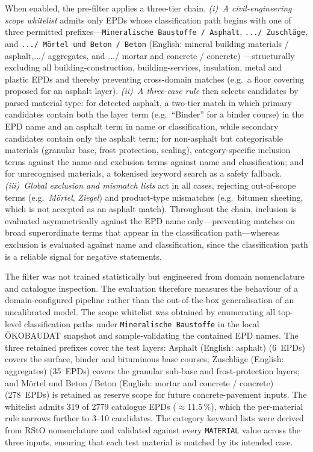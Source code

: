 \documentclass[10pt, a4paper, twocolumn]{article}
\begin{document}
When enabled, the pre-filter applies a three-tier chain. \emph{(i)~A civil-engineering
scope whitelist} admits only EPDs whose classification path begins with one of three
permitted prefixes---\texttt{Mineralische Baustoffe / Asphalt},
\texttt{.../ Zuschl\"age}, and \texttt{.../ M\"ortel und Beton / Beton} (English: mineral building materials / asphalt,.../ aggregates, and .../ mortar and concrete / concrete) ---structurally
excluding all building-construction, building-services, insulation, metal and plastic
EPDs and thereby preventing cross-domain matches (e.g.\ a floor covering proposed for
an asphalt layer). \emph{(ii)~A three-case rule} then selects candidates by parsed
material type: for detected asphalt, a two-tier match in which primary candidates
contain both the layer term (e.g.\ ``Binder'' for a binder course) in the EPD name
and an asphalt term in name or classification, while secondary candidates contain only
the asphalt term; for non-asphalt but categorisable materials (granular base, frost
protection, sealing), category-specific inclusion terms against the name and exclusion
terms against name and classification; and for unrecognised materials, a tokenised
keyword search as a safety fallback. \emph{(iii)~Global exclusion and mismatch
lists} act in all cases, rejecting out-of-scope terms (e.g.\ \emph{M\"ortel},
\emph{Ziegel}) and product-type mismatches (e.g.\ bitumen sheeting, which is not
accepted as an asphalt match). Throughout the chain, inclusion is evaluated
asymmetrically against the EPD name only---preventing matches on broad superordinate
terms that appear in the classification path---whereas exclusion is evaluated against
name and classification, since the classification path is a reliable signal for
negative statements.

The filter was not trained statistically but engineered from domain nomenclature and catalogue inspection. The evaluation therefore measures the behaviour of a domain-configured pipeline rather than the out-of-the-box generalisation of an uncalibrated model. The scope
whitelist was obtained by enumerating all top-level classification paths under
\texttt{Mineralische Baustoffe} in the local \"OKOBAUDAT snapshot and sample-validating
the contained EPD names. The three retained prefixes cover the test layers: Asphalt (English: asphalt)
(6~EPDs) covers the surface, binder and bituminous base courses; Zuschl\"age (English: aggregates)
(35~EPDs) covers the granular sub-base and frost-protection layers; and
M\"ortel und Beton\,/\,Beton (English: mortar and concrete / concrete) (278~EPDs) is retained as reserve scope for future
concrete-pavement inputs. The whitelist admits 319 of 2779 catalogue EPDs
($\approx$11.5\,\%), which the per-material rule narrows further to 3--10 candidates.
The category keyword lists were derived from RStO nomenclature and validated against
every \texttt{MATERIAL} value across the three inputs, ensuring that each test material
is matched by its intended case.
\end{document}
